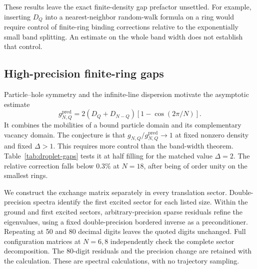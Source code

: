 \documentclass[aps,pre,reprint,amsmath,amssymb,longbibliography,floatfix]{revtex4-2}
\begin{document}
These results leave the exact finite-density gap prefactor unsettled.
For example, inserting $D_Q$ into a nearest-neighbor random-walk formula
on a ring would require control of finite-ring binding corrections
relative to the exponentially small band splitting. An estimate on the
whole band width does not establish that control.

\subsection{High-precision finite-ring gaps}
\label{app:droplet-ring-numerics}
Particle--hole symmetry and the infinite-line dispersion motivate the
asymptotic estimate
\begin{equation}
 g^{\mathrm{pred}}_{N,Q}
 =2(D_Q+D_{N-Q})\left[1-\cos(2\pi/N)\right].
 \label{eq:droplet-gap-conjecture}
\end{equation}
It combines the mobilities of a bound particle domain and its
complementary vacancy domain. The conjecture is that
$g_{N,Q}/g^{\mathrm{pred}}_{N,Q}\to1$ at fixed nonzero density and fixed
$\Delta>1$. This requires more control than the band-width theorem.
Table~\ref{tab:droplet-gaps} tests it at half filling for the matched
value $\Delta=2$. The relative correction falls below $0.3\%$ at
$N=18$, after being of order unity on the smallest rings.

We construct the exchange matrix separately in every translation sector.
Double-precision spectra identify the first excited sector for each
listed size. Within the ground and first excited sectors, arbitrary-precision
sparse residuals refine the eigenvalues, using a fixed double-precision
bordered inverse as a preconditioner. Repeating at 50 and 80 decimal
digits leaves the quoted digits unchanged. Full configuration matrices
at $N=6,8$ independently check the complete sector decomposition.
The 80-digit residuals and the precision change are retained with the
calculation. These are spectral calculations, with no trajectory sampling.
\end{document}
